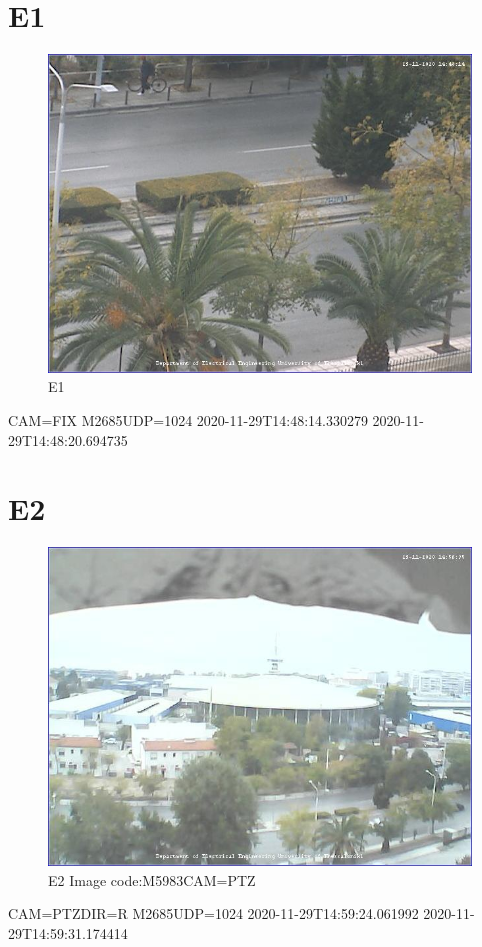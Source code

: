 \documentclass[hidelinks, 12pt, a4paper]{article}
\begin{document}
\section{E1}

\begin{figure}[h!]
\centering
	\includegraphics[height=.38\textheight, width=\textwidth]{assets/session2/image_fix.jpg}
	\caption{E1} 
\end{figure}
CAM=FIX
M2685UDP=1024
2020-11-29T14:48:14.330279
2020-11-29T14:48:20.694735


\section{E2}

\begin{figure}[h!]
\centering
	\includegraphics[height=.38\textheight, width=\textwidth]{assets/session2/image_ptz.jpg}
	\caption{E2 Image code:M5983CAM=PTZ} 
\end{figure}
CAM=PTZDIR=R
M2685UDP=1024
2020-11-29T14:59:24.061992
2020-11-29T14:59:31.174414
\end{document}
